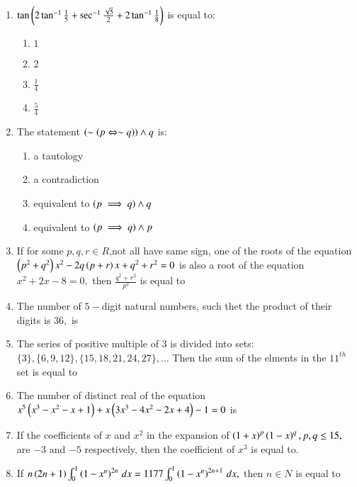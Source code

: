\documentclass[journal,12pt,twocolumn]{IEEEtran}
\theoremstyle{remark}
\begin{document}
\begin{enumerate}
    \item $\tan\left(2\tan^{-1}\frac{1}{5}+\sec^{-1}\frac{\sqrt{5}}{2}+2\tan^{-1}\frac{1}{8}\right)$ is equal to:
    \begin{enumerate}
        \item $1$
        \item $2$
        \item $\frac{1}{4}$
        \item $\frac{5}{4}$\\
    \end{enumerate}
    \item The statement $\left(\sim\left(p\Leftrightarrow\sim q\right)\right)\land q$ is:
    \begin{enumerate}
        \item a tautology
        \item a contradiction
        \item equivalent to $\left(p\implies q\right)\land q$
        \item equivalent to $\left(p\implies q\right)\land p$\\
    \end{enumerate}
    \item If for some $p,q,r\in R$,not all have same  sign, one of the roots of the equation $\left(p^2+q^2\right)x^2-2q\left(p+r\right)x+q^2+r^2=0$ is also a root of the equation $x^2+2x-8=0,$ then $\frac{q^2+r^2}{p^2}$ is equal to\\
    \item The number of $5-$digit natural numbers, such thet the product of their digits is $36,$ is\\
    \item The series of positive multiple of $3$ is divided into sets: $\{3\},\{6,9,12\},\{15,18,21,24,27\},\dots$ Then the sum of the elments in the $11^{th}$ set is equal to\\
    \item The number of distinct real of the equation $x^5\left(x^3-x^2-x+1\right) +x\left(3x^3-4x^2-2x+4\right)-1=0$ is\\
    \item If the coefficients of $x$ and $x^2$ in the expansion of $\left(1+x\right)^p\left(1-x\right)^q,p,q\le 15,$ are $-3$ and $-5$ respectively, then the coefficient of $x^3$ is equal to.\\
    \item If $n\left(2n+1\right)\int_{0}^{1}\left(1-x^n\right)^{2n}\,dx=1177\int_{0}^{1}\left(1-x^n\right)^{2n+1}\,dx,$ then $n\in N$ is equal to\\

\end{enumerate}
\end{document}
